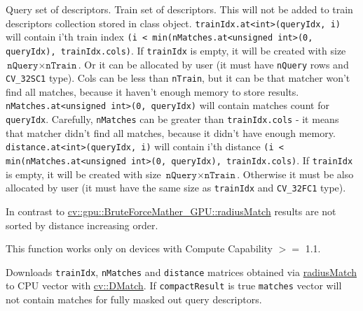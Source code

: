 \begin{description}
 {Query set of descriptors.}
 {Train set of descriptors. This will not be added to train descriptors collection stored in class object.}
 {\texttt{trainIdx.at<int>(queryIdx, i)} will contain i'th train index \newline\texttt{(i < min(nMatches.at<unsigned int>(0, queryIdx), trainIdx.cols)}. If \texttt{trainIdx} is empty, it will be created with size $\texttt{nQuery} \times \texttt{nTrain}$. Or it can be allocated by user (it must have \texttt{nQuery} rows and \texttt{CV\_32SC1} type). Cols can be less than \texttt{nTrain}, but it can be that matcher won't find all matches, because it haven't enough memory to store results.}
 {\texttt{nMatches.at<unsigned int>(0, queryIdx)} will contain matches count for \texttt{queryIdx}. Carefully, \texttt{nMatches} can be greater than \texttt{trainIdx.cols} - it means that matcher didn't find all matches, because it didn't have enough memory.}
 {\texttt{distance.at<int>(queryIdx, i)} will contain i'th distance \newline\texttt{(i < min(nMatches.at<unsigned int>(0, queryIdx), trainIdx.cols)}. If \texttt{trainIdx} is empty, it will be created with size $\texttt{nQuery} \times \texttt{nTrain}$. Otherwise it must be also allocated by user (it must have the same size as \texttt{trainIdx} and \texttt{CV\_32FC1} type).}
\end{description}

In contrast to \hyperref[cppfunc.gpu.BruteForceMatcher.radiusMatch]{cv::gpu::BruteForceMather\_GPU::radiusMatch} results are not sorted by distance increasing order.

This function works only on devices with Compute Capability $>=$ 1.1.

\label{cppfunc.gpu.BruteForceMatcher.radiusMatchDownload}
Downloads \texttt{trainIdx}, \texttt{nMatches} and \texttt{distance} matrices obtained via \hyperref[cppfunc.gpu.BruteForceMatcher.radiusMatchSingle]{radiusMatch} to CPU vector with \hyperref[cv.class.DMatch]{cv::DMatch}. If \texttt{compactResult} is true \texttt{matches} vector will not contain matches for fully masked out query descriptors.

